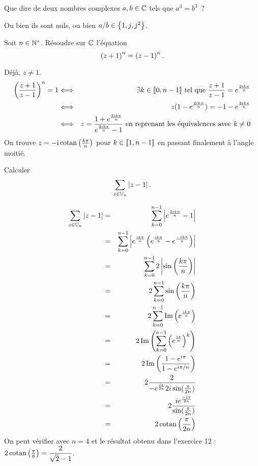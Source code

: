 \documentclass{magnolia}
\begin{document}
\begin{exos}
\exo Que dire de deux nombres complexes $a,b\in\mathbb{C}$ tels que $a^3=b^3$~?

\begin{sol}
Ou bien ils sont nuls, ou bien $a/b \in \left\{1,j,j^2\right\}$.
\end{sol}
\exo Soit $n\in{\mathbb{N}^*}$. Résoudre sur $\mathbb{C}$ l'équation
  \[\left(z+1\right)^n=\left(z-1\right)^n.\]
  \begin{sol}
  Déjà, $z\neq 1$.
  \begin{eqnarray*}
  \left(\frac{z+1}{z-1}\right)^n=1 &\Longleftrightarrow & \exists k\in \llbracket 0,n-1\rrbracket\text{ tel que } \frac{z+1}{z-1}= e^{\frac{2ik\pi}{n}}\\
  &\Longleftrightarrow & z(1-e^{\frac{2ik\pi}{n}})=-1-e^{\frac{2ik\pi}{n}}\\
  &\Longleftrightarrow & z=\frac{1+e^{\frac{2ik\pi}{n}}}{e^{\frac{2ik\pi}{n}}-1} \text{ en reprenant les équivalences avec }k\neq 0
  \end{eqnarray*}
  On trouve $z=-{\rm i}\operatorname{cotan}\left(\frac{k\pi}{n}\right)$ pour $k\in\left\llbracket 1,n-1\right\rrbracket$ en passant finalement à l'angle moitié.
  \end{sol}

\exo Calculer
  \[\sum_{z\in\U[n]} \abs{z-1}.\]
  \begin{sol}
\begin{eqnarray*}
  \sum_{z\in\U[n]} \abs{z-1}&=& \sum_{k=0}^{n-1} \abs{e^{\frac{2ik\pi}{n}}-1}\\
  &=& \sum_{k=0}^{n-1} \abs{e^{\frac{ik\pi}{n}}\p{e^{\frac{ik\pi}{n}}-e^{\frac{-ik\pi}{n}}}}\\
  &=& \sum_{k=0}^{n-1}2\abs{\sin\p{\frac{k\pi}{n}}}\\
  &=& 2\sum_{k=0}^{n-1}\sin\p{\frac{k\pi}{n}}\\
  &=& 2\sum_{k=0}^{n-1}\Im\p{e^{\frac{ik\pi}{n}}}\\
  &=& 2\Im\p{\sum_{k=0}^{n-1}\p{e^{\frac{i\pi}{n}}}^k}\\
  &=& 2\Im\p{\frac{1-e^{i\pi}}{1-e^{i\pi/n}}}\\
  &=& 2\frac{2}{-e^{\frac{i\pi}{2n}}2i\sin(\frac{\pi}{2n})}\\
  &=& 2\frac{ie^{\frac{-i\pi}{2n}}}{\sin(\frac{\pi}{2n})}\\
  &=& 2\cotan\p{\frac{\pi}{2n}}
\end{eqnarray*}
  On peut vérifier avec $n=4$ et le résultat obtenu dans l'exercice 12 :  $2\operatorname{cotan}\left(\frac{\pi}{8}\right)=\dfrac{2}{\sqrt{2}-1}$.
  \end{sol}
\end{exos}
\end{document}
